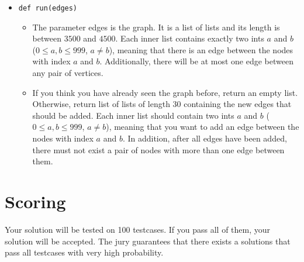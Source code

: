 \begin{itemize}
  \item \verb|def run(edges)| \\
  \begin{itemize}
    \item The parameter edges is the graph. It is a list of lists and its length is between $3500$ and $4500$.
    Each inner list contains exactly two ints $a$ and $b$ ($0 \leq a,b \leq 999$, $a \neq b$),
    meaning that there is an edge between the nodes with index $a$ and $b$. Additionally,
    there will be at most one edge between any pair of vertices.
    \item If you think you have already seen the graph before, return an empty list.\\
    Otherwise, return list of lists of length 30 containing the new edges that should be added.
    Each inner list should contain two ints $a$ and $b$ ($0 \leq a,b \leq 999$, $a \neq b$),
    meaning that you want to add an edge between the nodes with index $a$ and $b$.
    In addition, after all edges have been added, there must not exist a pair of nodes with more than one edge between them.
  \end{itemize}
\end{itemize}

\section*{Scoring}
Your solution will be tested on 100 testcases. If you pass all of them, your solution will be accepted.
The jury guarantees that there exists a solutions that pass all testcases with very high probability.
